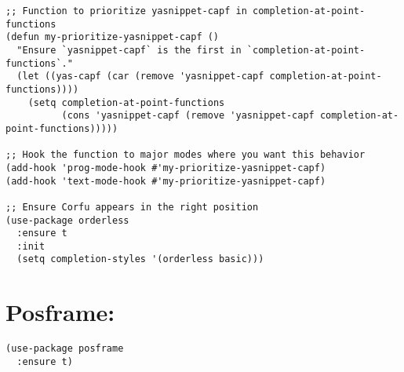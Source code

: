 \documentclass[11pt]{article}
\begin{document}
\begin{verbatim}
;; Function to prioritize yasnippet-capf in completion-at-point-functions
(defun my-prioritize-yasnippet-capf ()
  "Ensure `yasnippet-capf` is the first in `completion-at-point-functions`."
  (let ((yas-capf (car (remove 'yasnippet-capf completion-at-point-functions))))
    (setq completion-at-point-functions
          (cons 'yasnippet-capf (remove 'yasnippet-capf completion-at-point-functions)))))

;; Hook the function to major modes where you want this behavior
(add-hook 'prog-mode-hook #'my-prioritize-yasnippet-capf)
(add-hook 'text-mode-hook #'my-prioritize-yasnippet-capf)

;; Ensure Corfu appears in the right position
(use-package orderless
  :ensure t
  :init
  (setq completion-styles '(orderless basic)))
\end{verbatim}
\section{Posframe:}
\label{sec:org6464ee6}
\begin{verbatim}
(use-package posframe
  :ensure t)
\end{verbatim}
\end{document}
